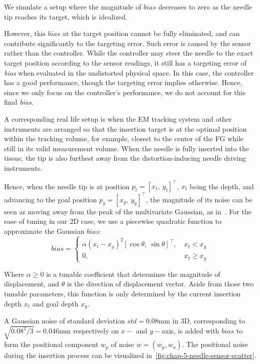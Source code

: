 We simulate a setup where the magnitude of $bias$ decreases to zero as the needle tip reaches its target, which is idealized.

However, this $bias$ at the target position cannot be fully eliminated, and can contribute significantly to the targeting error. Such error is caused by the sensor rather than the controller. While the controller may steer the needle to the exact target position according to the sensor readings, it still has a targeting error of \textit{bias} when evaluated in the undistorted physical space. In this case, the controller has a good performance, though the targeting error implies otherwise. Hence, since we only focus on the controller's performance, we do not account for this final \textit{bias}.

A corresponding real life setup is when the EM tracking system and other instruments are arranged so that the insertion target is at the optimal position within the tracking volume, for example, closest to the center of the FG while still in its valid measurement volume. When the needle is fully inserted into the tissue, the tip is also furthest away from the distortion-inducing needle driving instruments.

Hence, when the needle tip is at position $p_t = [x_t, \ y_t]^\top$, $x_t$ being the depth, and advancing to the goal position $p_{g} = [x_{g}, \ y_{g}]^\top$, the magnitude of its noise can be seen as moving away from the peak of the multivariate Gaussian, as in~\parencite{sadjadiSimultaneousElectromagneticTracking2016}. For the ease of tuning in our 2D case, we use a piecewise quadratic function to approximate the Gaussian $bias$:
\begin{equation}
  \label{eq:chap-5-noise-bias}
  bias = \begin{cases}
    \alpha(x_t - x_g)^2 [\cos\theta, \ \sin\theta]^\top, \ & x_t < x_{g} \\
    0, \ & x_t \geq x_{g}
  \end{cases}
\end{equation}

Where $\alpha \geq 0$ is a tunable coefficient that determines the magnitude of displacement, and $\theta$ is the direction of displacement vector. Aside from those two tunable parameters, this function is only determined by the current insertion depth $x_t$ and goal depth $x_g$.

A Gaussian noise of standard deviation $std = 0.08$mm in 3D, corresponding to $\sqrt{0.08^2 / 3} = 0.046$mm respectively on $x-$ and $y-$axis, is added with $bias$ to form the positional component $w_p$ of noise $w = (w_p, w_o)$. The positional noise during the insertion process can be visualized in~\cref{fig:chap-5-needle-sensor-scatter}.

